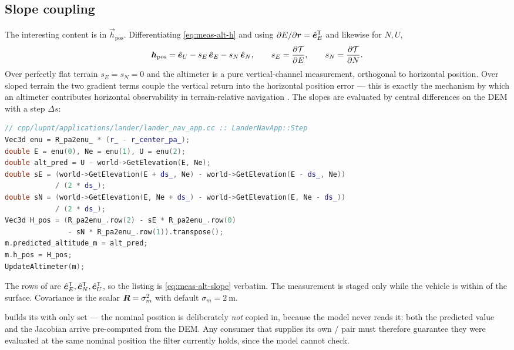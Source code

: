 \subsection{Slope coupling}

The interesting content is in $\vec{h}_\mathrm{pos}$. Differentiating
\cref{eq:meas-alt-h} and using
$\partial E/\partial\bm{r} = \hat{\bm{e}}_E^{\mathsf{T}}$ and likewise for $N, U$,
\begin{equation}
  \bm{h}_\mathrm{pos}
  = \hat{\bm{e}}_U
    - s_E\,\hat{\bm{e}}_E
    - s_N\,\hat{\bm{e}}_N ,
  \qquad
  s_E = \frac{\partial \mathcal{T}}{\partial E},
  \qquad
  s_N = \frac{\partial \mathcal{T}}{\partial N} .
  \label{eq:meas-alt-slope}
\end{equation}
Over perfectly flat terrain $s_E = s_N = 0$ and the altimeter is a pure
vertical-channel measurement, orthogonal to horizontal position. Over sloped
terrain the two gradient terms couple the vertical return into the horizontal
position error --- this is exactly the mechanism by which an altimeter
contributes horizontal observability in terrain-relative navigation
\citep{dai2025fullstack}. The slopes are evaluated by central differences on
the DEM with a step $\Delta s$:

\begin{lstlisting}[language=cpp, caption={DEM prediction and central-difference
  slope, evaluated by the driving simulation.}, label={lst:meas-alt-dem}]
// cpp/lupnt/applications/lander/lander_nav_app.cc :: LanderNavApp::Step
Vec3d enu = R_pa2enu_ * (r_ - r_center_pa_);
double E = enu(0), Ne = enu(1), U = enu(2);
double alt_pred = U - world->GetElevation(E, Ne);
double sE = (world->GetElevation(E + ds_, Ne) - world->GetElevation(E - ds_, Ne))
            / (2 * ds_);
double sN = (world->GetElevation(E, Ne + ds_) - world->GetElevation(E, Ne - ds_))
            / (2 * ds_);
Vec3d H_pos = (R_pa2enu_.row(2) - sE * R_pa2enu_.row(0)
               - sN * R_pa2enu_.row(1)).transpose();
m.predicted_altitude_m = alt_pred;
m.h_pos = H_pos;
UpdateAltimeter(m);
\end{lstlisting}

The rows of  are $\hat{\bm{e}}_E^{\mathsf{T}}, \hat{\bm{e}}_N^{\mathsf{T}},
\hat{\bm{e}}_U^{\mathsf{T}}$, so the listing is \cref{eq:meas-alt-slope} verbatim.
The measurement is staged only while the vehicle is within
 of the surface. Covariance is the scalar
$\bm{R} = \sigma_m^2$ with default $\sigma_m = \SI{2}{\meter}$.

\begin{lupntwarning}
   builds its  with
  only  set --- the nominal position is deliberately
  \emph{not} copied in, because the model never reads it: both the predicted
  value and the Jacobian arrive pre-computed from the DEM. Any consumer that
  supplies its own / pair must
  therefore guarantee they were evaluated at the same nominal position the
  filter currently holds, since the model cannot check.
\end{lupntwarning}

